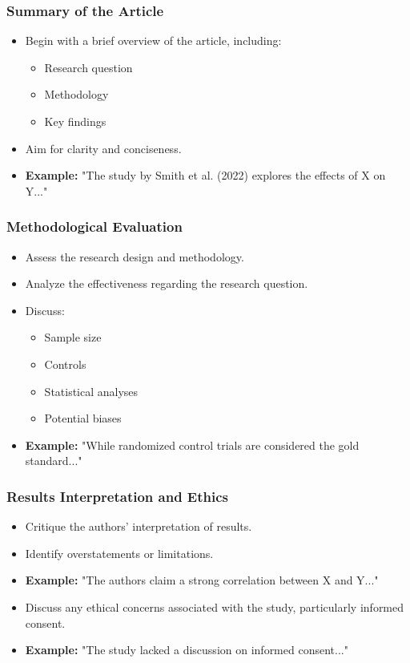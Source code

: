 \documentclass[aspectratio=169]{beamer}
\begin{document}
\begin{frame}[fragile]
    \frametitle{Summary of the Article}
    \begin{itemize}
        \item Begin with a brief overview of the article, including:
        \begin{itemize}
            \item Research question
            \item Methodology
            \item Key findings
        \end{itemize}
        \item Aim for clarity and conciseness.
        \item \textbf{Example:} "The study by Smith et al. (2022) explores the effects of X on Y..."
    \end{itemize}
\end{frame}

\begin{frame}[fragile]
    \frametitle{Methodological Evaluation}
    \begin{itemize}
        \item Assess the research design and methodology.
        \item Analyze the effectiveness regarding the research question.
        \item Discuss:
        \begin{itemize}
            \item Sample size
            \item Controls
            \item Statistical analyses
            \item Potential biases
        \end{itemize}
        \item \textbf{Example:} "While randomized control trials are considered the gold standard..."
    \end{itemize}
\end{frame}

\begin{frame}[fragile]
    \frametitle{Results Interpretation and Ethics}
    \begin{itemize}
        \item Critique the authors' interpretation of results.
        \item Identify overstatements or limitations.
        \item \textbf{Example:} "The authors claim a strong correlation between X and Y..."
        \item Discuss any ethical concerns associated with the study, particularly informed consent.
        \item \textbf{Example:} "The study lacked a discussion on informed consent..."
    \end{itemize}
\end{frame}
\end{document}
